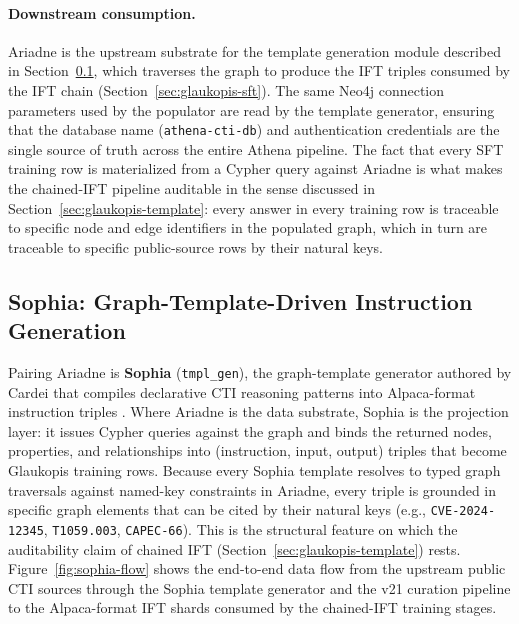 \documentclass[conference]{IEEEtran}
\providecommand{\hfid}[1]{{\small\nolinkurl{#1}}}
\begin{document}
\paragraph{Downstream consumption.}
Ariadne is the upstream substrate for the template generation module described in Section~\ref{sec:ariadne-templates}, which traverses the graph to produce the IFT triples consumed by the IFT chain (Section~\ref{sec:glaukopis-sft}). The same Neo4j connection parameters used by the populator are read by the template generator, ensuring that the database name (\texttt{athena-cti-db}) and authentication credentials are the single source of truth across the entire Athena pipeline. The fact that every SFT training row is materialized from a Cypher query against Ariadne is what makes the chained-IFT pipeline auditable in the sense discussed in Section~\ref{sec:glaukopis-template}: every answer in every training row is traceable to specific node and edge identifiers in the populated graph, which in turn are traceable to specific public-source rows by their natural keys.

\subsection{Sophia: Graph-Template-Driven Instruction Generation}
\label{sec:ariadne-templates}

Pairing Ariadne is \textbf{Sophia} (\hfid{tmpl_gen}), the graph-template generator authored by Cardei that compiles declarative CTI reasoning patterns into Alpaca-format instruction triples \cite{cardei2025ift}. Where Ariadne is the data substrate, Sophia is the projection layer: it issues Cypher queries against the graph and binds the returned nodes, properties, and relationships into (instruction, input, output) triples that become Glaukopis training rows. Because every Sophia template resolves to typed graph traversals against named-key constraints in Ariadne, every triple is grounded in specific graph elements that can be cited by their natural keys (e.g., \hfid{CVE-2024-12345}, \texttt{T1059.003}, \hfid{CAPEC-66}). This is the structural feature on which the auditability claim of chained IFT (Section~\ref{sec:glaukopis-template}) rests. Figure~\ref{fig:sophia-flow} shows the end-to-end data flow from the upstream public CTI sources through the Sophia template generator and the v21 curation pipeline to the Alpaca-format IFT shards consumed by the chained-IFT training stages.
\end{document}
